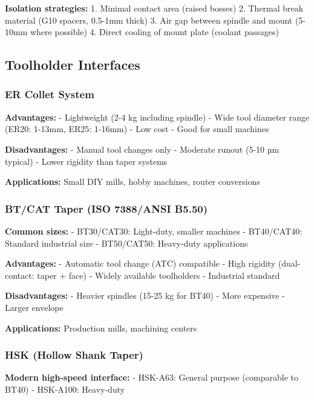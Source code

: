 \documentclass[
]{article}
\begin{document}
\textbf{Isolation strategies:} 1. Minimal contact area (raised bosses)
2. Thermal break material (G10 spacers, 0.5-1mm thick) 3. Air gap
between spindle and mount (5-10mm where possible) 4. Direct cooling of
mount plate (coolant passages)

\subsection{Toolholder Interfaces}\label{toolholder-interfaces}

\subsubsection{ER Collet System}\label{er-collet-system}

\textbf{Advantages:} - Lightweight (2-4 kg including spindle) - Wide
tool diameter range (ER20: 1-13mm, ER25: 1-16mm) - Low cost - Good for
small machines

\textbf{Disadvantages:} - Manual tool changes only - Moderate runout
(5-10 µm typical) - Lower rigidity than taper systems

\textbf{Applications:} Small DIY mills, hobby machines, router
conversions

\subsubsection{BT/CAT Taper (ISO 7388/ANSI
B5.50)}\label{btcat-taper-iso-7388ansi-b5.50}

\textbf{Common sizes:} - BT30/CAT30: Light-duty, smaller machines -
BT40/CAT40: Standard industrial size - BT50/CAT50: Heavy-duty
applications

\textbf{Advantages:} - Automatic tool change (ATC) compatible - High
rigidity (dual-contact: taper + face) - Widely available toolholders -
Industrial standard

\textbf{Disadvantages:} - Heavier spindles (15-25 kg for BT40) - More
expensive - Larger envelope

\textbf{Applications:} Production mills, machining centers

\subsubsection{HSK (Hollow Shank Taper)}\label{hsk-hollow-shank-taper}

\textbf{Modern high-speed interface:} - HSK-A63: General purpose
(comparable to BT40) - HSK-A100: Heavy-duty
\end{document}

